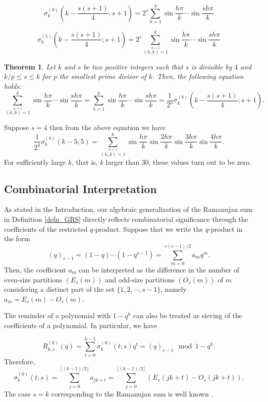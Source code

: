 \documentclass[12pt]{article}
\newtheorem{thm}{Theorem}[subsection]%
\begin{document}
$$
\sigma^{(0)}_{k}\left(k-\frac{s(s+1)}{4};s+1\right)=2^{s}\sum_{h=1}^{k} \sin\frac{h\pi}{k}\cdots \sin \frac{sh\pi}{k}
$$

$$
\sigma^{(1)}_{k}\left(k-\frac{s(s+1)}{4};s+1\right)=2^{s}\sum_{\stackrel{h=1}{(h,k)=1}}^{k} \sin\frac{h\pi}{k}\cdots \sin \frac{sh\pi}{k}
$$

\begin{thm} Let $k$ and $s$ be two positive integers such that $s$ is divisible by $4$ and $k/p\leq s\leq k$ for $p$ the smallest prime divisor of $k$. Then, the following equation holds: 
$$
\sum_{\stackrel{h=1}{(h,k)=1}}^{k} \sin\frac{h\pi}{k}\cdots \sin \frac{sh\pi}{k}=\sum_{h=1}^{k} \sin\frac{h\pi}{k}\cdots \sin \frac{sh\pi}{k} = \frac{1}{2^{s}}\sigma_{k}^{(b)}\left(k-\frac{s(s+1)}{4};s+1\right).
$$    
\end{thm}
Suppose $s=4$ then from the above equation we have
$$
\frac{1}{2^{4}}\sigma_{k}^{(b)}\left(k-5;5\right)=\sum_{\stackrel{h=1}{(h,k)=1}}^{k} \sin\frac{h\pi}{k}\sin \frac{2h\pi}{k}\sin \frac{3h\pi}{k}\sin \frac{4h\pi}{k}.
$$
For sufficiently large $k$, that is, $k$ larger than $30$, these values turn out to be zero. 

\subsection{Combinatorial Interpretation}

As stated in the Introduction, our algebraic generalization of the Ramanujan sum in Definition \ref{defn_GRS} directly reflects combinatorial significance through the coefficients of the restricted \( q \)-product. Suppose that we write the $q$-product in the form 
$$
(q)_{s-1}=(1-q)\cdots (1-q^{s-1}) = \sum_{m=0}^{s(s-1)/2} a_{m}q^{m}.
$$
Then, the coefficient $a_{m}$ can be interpreted as the difference in the number of even-size partitions $(E_{s}(m))$ and odd-size partitions $(O_{s}(m))$ of $m$ considering a distinct part of the set $\{1,2,\cdots,s-1\}$, namely $a_{m}=E_{s}(m)-O_{s}(m)$.

The reminder of a polynomial with $1-q^{k}$ can also be treated as sieving of the coefficients of a polynomial. In particular, we have 

$$
R_{k,s}^{(0)}(q)=\sum_{t=0}^{k-1} \sigma_{k}^{(0)}(t;s)q^{t}=(q)_{s-1} \mod 1-q^{k}. 
$$
Therefore,
$$
\sigma_{k}^{(0)}(t;s)=\sum_{j=0}^{\lfloor (k-1)/2 \rfloor} a_{jk+t}=\sum_{j=0}^{\lfloor (k-1)/2 \rfloor} \left(E_{s}(jk+t)-O_{s}(jk+t)\right).
$$
The case $s=k$ corresponding to the Ramanujan sum is well known \cite{Ramanathan}. 
\end{document}
